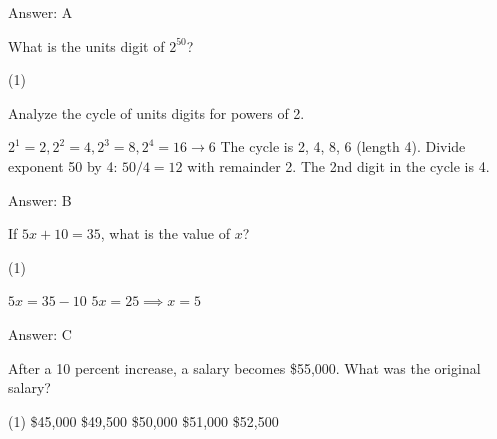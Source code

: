 \documentclass[11pt,paper=a4,answers]{exam}
\begin{document}
\begin{questions}
\begin{solution}
Answer: \colorbox{yellow!100}{A}
\end{solution}

\vspace{1cm}


\question
What is the units digit of $2^{50}$?

\begin{tasks}(1)
    
\end{tasks}

\begin{solution}
Analyze the cycle of units digits for powers of 2.
\vspace{5pt}
\begin{center}
$2^1 = 2, 2^2 = 4, 2^3 = 8, 2^4 = 16 \to 6$
\vspace{5pt}
The cycle is 2, 4, 8, 6 (length 4).
\vspace{5pt}
Divide exponent 50 by 4: $50 / 4 = 12$ with remainder 2.
\vspace{5pt}
The 2nd digit in the cycle is 4.
\end{center}

Answer: \colorbox{yellow!100}{B}
\end{solution}

\vspace{1cm}

\question
If $5x + 10 = 35$, what is the value of $x$?

\begin{tasks}(1)
    
\end{tasks}

\begin{solution}
\begin{center}
$5x = 35 - 10$
\vspace{5pt}
$5x = 25 \implies x = 5$
\end{center}

Answer: \colorbox{yellow!100}{C}
\end{solution}

\vspace{1cm}

\question
After a 10 percent increase, a salary becomes \$55,000. What was the original salary?

\begin{tasks}(1)
\task[A)] \$45,000 \task[B)] \$49,500 \task[C)] \$50,000 \task[D)] \$51,000 \task[E)] \$52,500
\end{tasks}


\end{questions}
\end{document}
